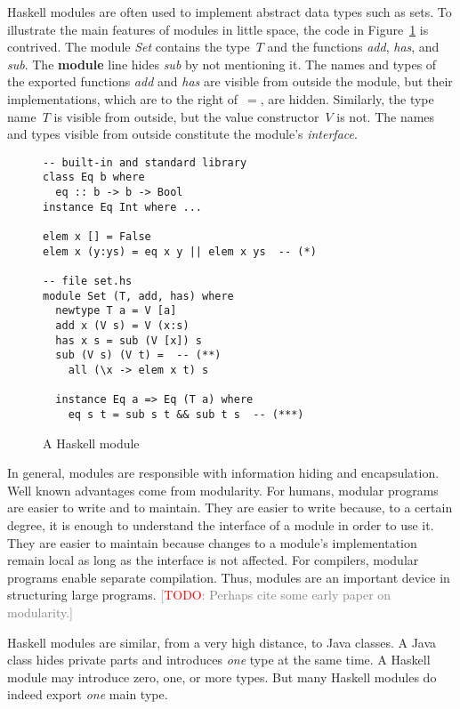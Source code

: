 \documentclass[conference,compsoc]{IEEEtran}
\newcommand{\todo}[1]{{\small \textcolor{gray}{[\textcolor{red}{TODO}: #1]}}}
\begin{document}

Haskell modules are often used to implement abstract data types such as
sets.  To illustrate the main features of modules in little space, the code
in Figure~\ref{fig:haskell} is contrived.  The module \textit{Set} contains
the type~$T$ and the functions \textit{add}, \textit{has}, and
\textit{sub}. The \textbf{module} line hides \textit{sub} by not mentioning
it. The names and types of the exported functions \textit{add} and
\textit{has} are visible from outside the module, but their
implementations, which are to the right of~$=$, are hidden.  Similarly, the
type name~$T$ is visible from outside, but the value constructor~$V$ is
not.  The names and types visible from outside constitute the module's
\emph{interface}.

\begin{figure}\centering\footnotesize
\begin{verbatim}
-- built-in and standard library
class Eq b where
  eq :: b -> b -> Bool
instance Eq Int where ...

elem x [] = False
elem x (y:ys) = eq x y || elem x ys  -- (*)

-- file set.hs
module Set (T, add, has) where
  newtype T a = V [a]
  add x (V s) = V (x:s)
  has x s = sub (V [x]) s
  sub (V s) (V t) =  -- (**)
    all (\x -> elem x t) s

  instance Eq a => Eq (T a) where
    eq s t = sub s t && sub t s  -- (***)
\end{verbatim}
\caption{A Haskell module}\label{fig:haskell}
\end{figure}

In general, modules are responsible with information hiding and
encapsulation. Well known advantages come from modularity. For humans,
modular programs are easier to write and to maintain. They are easier to
write because, to a certain degree, it is enough to understand the
interface of a module in order to use it. They are easier to maintain
because changes to a module's implementation remain local as long as the
interface is not affected. For compilers, modular programs enable separate
compilation. Thus, modules are an important device in structuring large
programs. \todo{Perhaps cite some early paper on modularity.}

Haskell modules are similar, from a very high distance, to Java classes.  A
Java class hides private parts and introduces \emph{one} type at the same
time. A Haskell module may introduce zero, one, or more types.  But many
Haskell modules do indeed export \emph{one} main type. 
\end{document}
